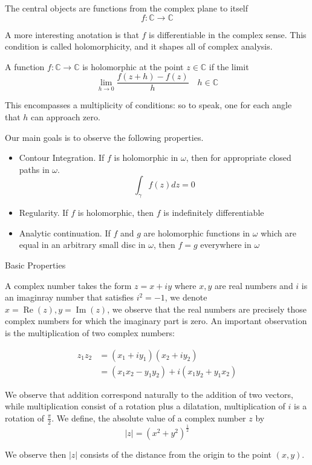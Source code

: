 \documentclass[11pt,twoside]{book}
\newcommand{\goesto}{\rightarrow}
\newcommand{\CC}{\mathbb{C}}
\begin{document}
The central objects are functions from the complex plane to itself
\[
	f: \mathbb{C} \goesto \mathbb{C}
\]

A more interesting anotation is that $f$ is differentiable in the complex sense. This condition is called holomorphicity, and it shapes all of complex analysis.

A function $f:\mathbb{C} \goesto \mathbb{C}$ is holomorphic at the point $z \in \mathbb{C}$ if the limit
\[
	\lim_{h \goesto 0} \frac{f(z+h)-f(z)}{h} \quad h \in \CC
\]

This encompasses a multiplicity of conditions: so to speak, one for each angle that $h$ can approach zero.

Our main goals is to observe the following properties.

\begin{itemize}
	\item Contour Integration. If $f$ is holomorphic in $\omega$, then for appropriate closed paths in $\omega$.
	\[
		\int_\gamma f(z) dz = 0
	\]
	\item Regularity. If $f$ is holomorphic, then $f$ is indefinitely differentiable
	\item Analytic continuation. If $f$ and $g$ are holomorphic functions in $\omega$ which are equal in an arbitrary small disc in $\omega$, then $f = g$ everywhere in $\omega$
\end{itemize}

Basic Properties

A complex number takes the form $z = x + iy$ where $x,y $ are real numbers and $i$ is an imaginray number that satisfies $i^2 = -1$, we denote $x = \operatorname{Re}(z), y = \operatorname{Im}(z) $, we observe that the real numbers are precisely those complex numbers for which the imaginary part is zero.
An important observation is the multiplication of two complex numbers:

\begin{align*}
	z_1 z_2 &= (x_1 + i y_1)(x_2 + i y_2) \\
			&= (x_1x_2 - y_1y_2) + i(x_1y_2 + y_1x_2)
\end{align*}

We observe that addition correspond naturally to the addition of two vectors, while multiplication consist of a rotation plus a dilatation, multiplication of $i$ is a rotation of $\frac{\pi}{2}$. We define, the absolute value of a complex number $z$ by
\[
	|z| = (x^2 + y^2)^{\frac{1}{2}}
\]

We observe then $|z|$ consists of the distance from the origin to the point $(x,y)$.
\end{document}
